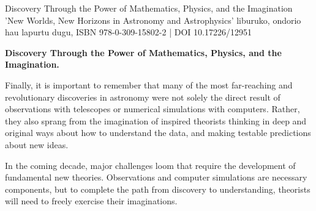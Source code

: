 
Discovery Through the Power of Mathematics, Physics, and the Imagination
'New Worlds, New Horizons in Astronomy and Astrophysics' liburuko, ondorio hau lapurtu dugu,
ISBN 978-0-309-15802-2 | DOI 10.17226/12951

\begin{displayquote}
\textbf{Discovery Through the Power of Mathematics, Physics, and the Imagination.}

Finally, it is important to remember that many of the most far-reaching and revolutionary discoveries in astronomy were not solely the direct result of observations with telescopes or numerical simulations with computers. Rather, they also sprang from the imagination of inspired theorists thinking in deep and original ways about how to understand the data, and making testable predictions about new ideas.

In the coming decade, major challenges loom that require the development of fundamental new theories. Observations and computer simulations are necessary components, but to complete the path from discovery to understanding, theorists will need to freely exercise their imaginations.
\end{displayquote}